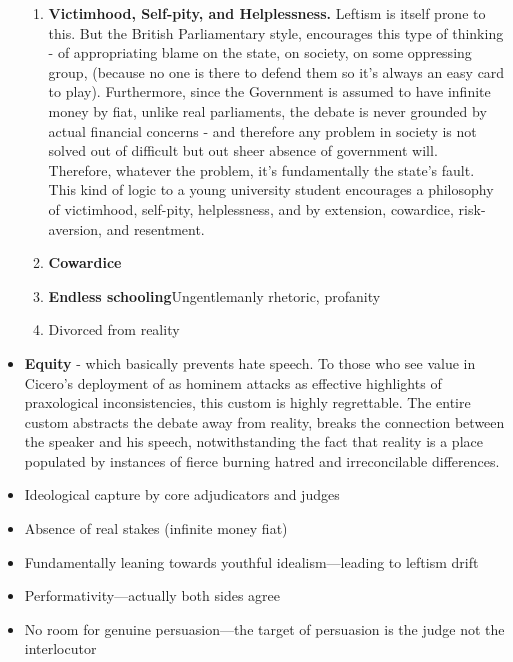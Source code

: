 \begin{itemize}
\begin{enumerate}
            \item \textbf{Victimhood, Self-pity, and Helplessness.} Leftism is itself prone to this. But the British Parliamentary style, encourages this type of thinking - of appropriating blame on the state, on society, on some oppressing group, (because no one is there to defend them so it's always an easy card to play). Furthermore, since the Government is assumed to have infinite money by fiat, unlike real parliaments, the debate is never grounded by actual financial concerns - and therefore any problem in society is not solved out of difficult but out sheer absence of government will. Therefore, whatever the problem, it's fundamentally the state's fault. This kind of logic to a young university student encourages a philosophy of victimhood, self-pity, helplessness, and by extension, cowardice, risk-aversion, and resentment.
            \item \textbf{Cowardice}
            
            \item \textbf{Endless schooling}Ungentlemanly rhetoric, profanity
            \item Divorced from reality
    
    
        \end{enumerate}
    


    \item \textbf{Equity} - which basically prevents hate speech. To those who see value in Cicero's deployment of as hominem attacks as effective highlights of praxological inconsistencies, this custom is highly regrettable. The entire custom abstracts the debate away from reality, breaks the connection between the speaker and his speech, notwithstanding the fact that reality is a place populated by instances of fierce burning hatred and irreconcilable differences.
    
        \item Ideological capture by core adjudicators and judges
        \item Absence of real stakes (infinite money fiat)
        \item Fundamentally leaning towards youthful idealism—leading to leftism drift
        \item Performativity—actually both sides agree 
        \item No room for genuine persuasion—the target of persuasion is the judge not the interlocutor
        

\end{itemize}
